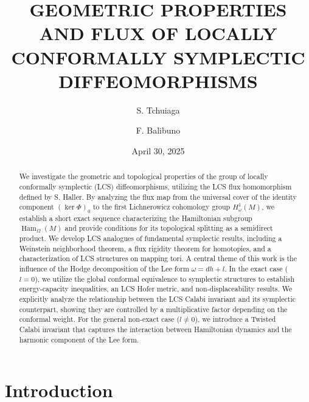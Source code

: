 \documentclass[11pt,a4paper]{amsart}
\title[Geometric Properties and Flux of LCS Diffeomorphisms]{GEOMETRIC PROPERTIES AND FLUX OF LOCALLY CONFORMALLY SYMPLECTIC DIFFEOMORPHISMS}
\author{S. Tchuiaga}
\author{F. Balibuno}
\date{April 30, 2025}
\theoremstyle{definition}
\theoremstyle{remark}
\newcommand{\Ham}{\operatorname{Ham}}
\begin{document}
	
	
	\begin{abstract}
		
		We investigate the geometric and topological properties of the group of locally conformally symplectic (LCS) diffeomorphisms, utilizing the LCS flux homomorphism defined by S. Haller. By analyzing the flux map from the universal cover of the identity component $(\ker \Phi)_0$ to the first Lichnerowicz cohomology group $H_\omega^1(M)$, we establish a short exact sequence characterizing the Hamiltonian subgroup $\Ham_\Omega(M)$ and provide conditions for its topological splitting as a semidirect product. We develop LCS analogues of fundamental symplectic results, including a Weinstein neighborhood theorem, a flux rigidity theorem for homotopies, and a characterization of LCS structures on mapping tori. A central theme of this work is the influence of the Hodge decomposition of the Lee form $\omega = dh + l$. In the exact case ($l=0$), we utilize the global conformal equivalence to symplectic structures to establish energy-capacity inequalities, an LCS Hofer metric, and non-displaceability results. We explicitly analyze the relationship between the LCS Calabi invariant and its symplectic counterpart, showing they are controlled by a multiplicative factor depending on the conformal weight. For the general non-exact case ($l \neq 0$), we introduce a Twisted Calabi invariant that captures the interaction between Hamiltonian dynamics and the harmonic component of the Lee form.
		
	\end{abstract}
	
	\maketitle
	
	\tableofcontents
	
	\section{Introduction}
	
\end{document}
